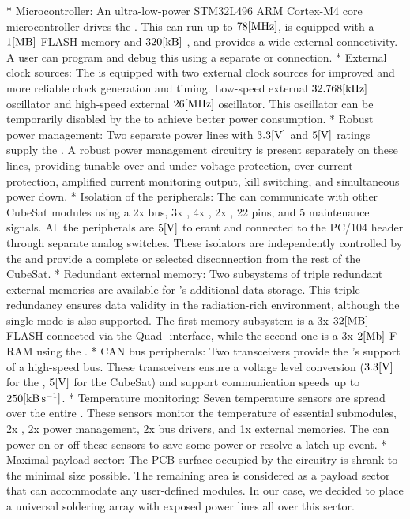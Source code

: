 \begitems
    * {\sbf Microcontroller:} An ultra-low-power STM32L496 ARM Cortex-M4 core microcontroller drives the . This  can run up to $78\rm{[MHz]}$, is equipped with a $1\rm{[MB]}$ FLASH memory and $320\rm{[kB]}$ , and provides a wide external connectivity. A user can program and debug this  using a separate  or  connection.
    * {\sbf External clock sources:} The  is equipped with two external clock sources for improved and more reliable clock generation and timing. Low-speed external $32.768\rm{[kHz]}$ oscillator and high-speed external $26\rm{[MHz]}$ oscillator. This oscillator can be temporarily disabled by the  to achieve better power consumption.
    * {\sbf Robust power management:} Two separate power lines with $3.3\rm{[V]}$ and $5\rm{[V]}$ ratings supply the . A robust power management circuitry is present separately on these lines, providing tunable over and under-voltage protection, over-current protection, amplified current monitoring output, kill switching, and simultaneous power down.
    * {\sbf Isolation of the peripherals:} The  can communicate with other CubeSat modules using a 2x  bus, 3x , 4x , 2x , 22  pins, and 5 maintenance signals. All the peripherals are $5\rm{[V]}$ tolerant and connected to the PC/104 header through separate analog switches. These isolators are independently controlled by the  and provide a complete or selected disconnection from the rest of the CubeSat.
    * {\sbf Redundant external memory:} Two subsystems of triple redundant external memories are available for 's additional data storage. This triple redundancy ensures data validity in the radiation-rich environment, although the single-mode is also supported. The first memory subsystem is a 3x $32\rm{[MB]}$ FLASH connected via the Quad- interface, while the second one is a 3x $2\rm{[Mb]}$ F-RAM using the .
    * {\sbf CAN bus peripherals:} Two  transceivers provide the 's support of a high-speed  bus.  These transceivers ensure a voltage level conversion ($3.3\rm{[V]}$ for the , $5\rm{[V]}$ for the CubeSat) and support communication speeds up to $250\rm{[kB\,s^{-1}]}$.
    * {\sbf Temperature monitoring:} Seven  temperature sensors are spread over the entire . These sensors monitor the temperature of essential submodules, 2x , 2x power management, 2x  bus drivers, and 1x external memories. The  can power on or off these sensors to save some power or resolve a latch-up event.
    * {\sbf Maximal payload sector:} The PCB surface occupied by the  circuitry is shrank to the minimal size possible. The remaining area is considered as a payload sector that can accommodate any user-defined modules. In our case, we decided to place a universal soldering array with exposed power lines all over this sector.
\enditems



